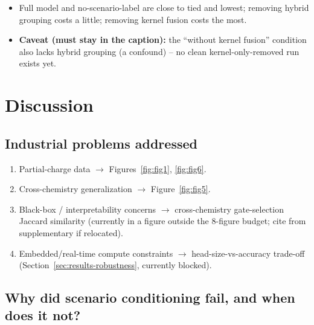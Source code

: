 \documentclass[preprint,12pt]{elsarticle}
\begin{document}
\begin{itemize}
  \item Full model and no-scenario-label are close to tied and lowest; removing hybrid grouping costs a little; removing kernel fusion costs the most.
  \item \textbf{Caveat (must stay in the caption):} the ``without kernel fusion'' condition also lacks hybrid grouping (a confound) -- no clean kernel-only-removed run exists yet.
\end{itemize}

\section{Discussion}

\subsection{Industrial problems addressed}

\begin{enumerate}
  \item Partial-charge data $\rightarrow$ Figures~\ref{fig:fig1}, \ref{fig:fig6}.
  \item Cross-chemistry generalization $\rightarrow$ Figure~\ref{fig:fig5}.
  \item Black-box / interpretability concerns $\rightarrow$ cross-chemistry gate-selection Jaccard similarity (currently in a figure outside the 8-figure budget; cite from supplementary if relocated).
  \item Embedded/real-time compute constraints $\rightarrow$ head-size-vs-accuracy trade-off (Section~\ref{sec:results-robustness}, currently blocked).
\end{enumerate}

\subsection{Why did scenario conditioning fail, and when does it not?}
\label{sec:discussion-negative}
\end{document}
